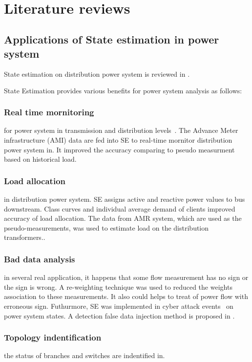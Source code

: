 \section{Literature reviews}

\subsection{Applications of State estimation in power system}
State estimation on distribution power system is reviewed in \cite{b9}.

State Estimation provides various benefits for power system analysis as follows:
\subsubsection{Real time mornitoring} for power system in transmission and distribution levels~\cite{b5}. The Advance Meter infrastructure (AMI) data are fed into SE to real-time mornitor distribution power system in\cite{b7}. It improved the accuracy comparing to pseudo measurment based on historical load.

\subsubsection{Load allocation} in distribution power system. SE assigns active and reactive power values to bus downstream\cite{b6}. Class curves and individual average demand of clients improved accuracy of load allocation\cite{b4}.  The data from AMR system, which are used as the pseudo-measurements, was used to estimate load on the distribution transformers.\cite{b5}.

\subsubsection{Bad data analysis} in several real application, it happens that some flow measurement has no sign or the sign is wrong.
A re-weighting technique was used to reduced the weights association to these measurements\cite{b6}.
It also could helps to treat of power flow with erroneous sign.
Futhurmore, SE was implemented in cyber attack events~\cite{b10} on power system states. A detection false data injection method is proposed in \cite{b8}.

\subsubsection{Topology indentification} the status of branches and switches are indentified in\cite{b6}.


